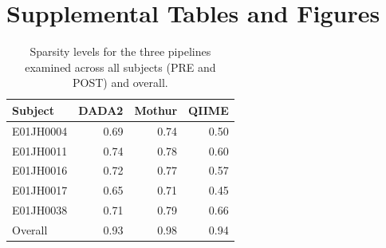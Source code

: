 \documentclass[12pt]{article}
\begin{document}
\cleardoublepage


 

\cleardoublepage

\section*{Supplemental Tables and Figures}
\clearpage

\begin{table}
\caption{\label{tab:sparsity}Sparsity levels for the three pipelines examined across all subjects (PRE and POST) and overall.}
\centering
\begin{tabular}[t]{lrrr}
\toprule
Subject   & DADA2 & Mothur & QIIME \\
\midrule
E01JH0004 & 0.69  & 0.74   & 0.50  \\
E01JH0011 & 0.74  & 0.78   & 0.60  \\
E01JH0016 & 0.72  & 0.77   & 0.57  \\
E01JH0017 & 0.65  & 0.71   & 0.45  \\
E01JH0038 & 0.71  & 0.79   & 0.66  \\
\midrule
Overall   & 0.93  & 0.98   & 0.94  \\
\bottomrule
\end{tabular}
\end{table}

\begin{table}
\caption{\label{tab:relAbuErrorTbl}Maximum feature-level error rate bias (median error rate) and variance (robust COV) by pipeline and individual.}
\centering
{}
\end{table}
\end{document}
